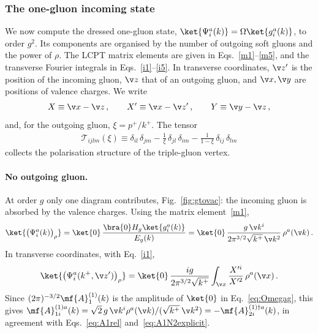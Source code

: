 \subsubsection{The one-gluon incoming state}\label{sec:singleglue}
We now compute the dressed one-gluon state, $\ket{\Psi^{a}_{i}(k)}=\Omega\ket{g^{a}_{i}(k)}$, to order
$g^{2}$. Its components are organised by the number of outgoing soft gluons and the power of $\rho$. The
LCPT matrix elements are given in Eqs.~\eqref{m1}--\eqref{m5}, and the transverse Fourier integrals in
Eqs.~\eqref{i1}--\eqref{i5}. In transverse coordinates, $\v z'$ is the position of the incoming gluon,
$\v z$ that of an outgoing gluon, and $\v x,\v y$ are positions of valence charges. We write
\begin{align}\label{eq:XXY}
X\equiv\v x-\v z\,,\qquad X'\equiv\v x-\v z'\,,\qquad Y\equiv\v y-\v z\,,
\end{align}
and, for the outgoing gluon, $\xi=p^{+}/k^{+}$. The tensor
\begin{align}\label{eq:Ttensor}
\mathcal{T}_{ijlm}(\xi)\equiv\delta_{il}\,\delta_{jm}-\frac{1}{\xi}\,\delta_{jl}\,\delta_{im}-\frac{1}{1-\xi}\,\delta_{ij}\,\delta_{lm}
\end{align}
collects the polarisation structure of the triple-gluon vertex.

\paragraph{No outgoing gluon.}
At order $g$ only one diagram contributes, Fig.~\ref{fig:gtovac}: the incoming gluon is absorbed by the
valence charges. Using the matrix element~\eqref{m1},
\begin{align}\label{eq:psirho}
\ket{\big(\Psi^{a}_{i}(k)\big)_{\rho}}=\ket{0}\,\frac{\bra{0}H_{g}\ket{g^{a}_{i}(k)}}{E_{g}(k)}
=\ket{0}\,\frac{g\,\v k^{i}}{2\pi^{3/2}\sqrt{k^{+}}\,\v k^{2}}\,\rho^{a}(\v k)\,.
\end{align}
In transverse coordinates, with Eq.~\eqref{i1},
\begin{align}\label{eq:psirhoX}
\ket{\big(\Psi^{a}_{i}(k^{+},\v z')\big)_{\rho}}=\ket{0}\,\frac{ig}{2\pi^{3/2}\sqrt{k^{+}}}\int_{\v x}\frac{X'^{i}}{X'^{2}}\,\rho^{a}(\v x)\,.
\end{align}
Since $(2\pi)^{-3/2}\mf{A}^{(1)}_{1}(k)$ is the amplitude of $\ket{0}$ in Eq.~\eqref{eq:Omegag}, this gives
$\mf{A}^{(1)a}_{1i}(k)=\sqrt{2}\,g\,\v k^{i}\rho^{a}(\v k)/(\sqrt{k^{+}}\,\v k^{2})=-\mf{A}^{(1)\dagger a}_{2i}(k)$, in
agreement with Eqs.~\eqref{eq:A1rel} and~\eqref{eq:A1N2explicit}.

